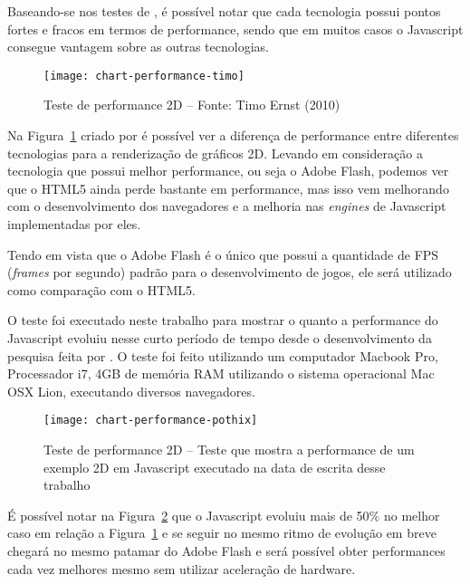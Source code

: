 Baseando-se nos testes de , é possível notar que
cada tecnologia possui pontos fortes e fracos em termos de performance, sendo que
em muitos casos o Javascript consegue vantagem sobre as outras tecnologias.

\begin{figure}[H]
  \centering
	\texttt{[image: chart-performance-timo]}
  \caption{Teste de performance 2D {--} Fonte: Timo Ernst (2010)}
  \label{img:chart-performance-timo}
\end{figure}

Na Figura~\ref{img:chart-performance-timo} criado por  é
possível ver a diferença de performance entre diferentes tecnologias para a
renderização de gráficos 2D.
Levando em consideração a tecnologia que possui melhor performance,
ou seja o Adobe Flash, podemos ver que o HTML5 ainda perde bastante em performance,
mas isso vem melhorando com o desenvolvimento dos navegadores e a melhoria nas
\textit{engines} de Javascript implementadas por eles.

Tendo em vista que o Adobe Flash é o único que possui a quantidade de FPS
(\textit{frames} por segundo) padrão para o desenvolvimento de jogos,
ele será utilizado como comparação com o HTML5.

O teste foi executado neste trabalho para mostrar o quanto a performance do Javascript evoluiu nesse curto
período de tempo desde o desenvolvimento da pesquisa feita por
. O teste foi feito utilizando um
computador Macbook Pro, Processador i7, 4GB de memória RAM utilizando o sistema
operacional Mac OSX Lion, executando diversos navegadores.

\begin{figure}[H]
  \centering
	\texttt{[image: chart-performance-pothix]}
  \caption{Teste de performance 2D {--} Teste que mostra a performance
  de um exemplo 2D em Javascript executado na data de escrita desse trabalho}
  \label{img:chart-performance-pothix}
\end{figure}

É possível notar na Figura~\ref{img:chart-performance-pothix} que o
Javascript evoluiu mais de 50\% no melhor caso
em relação a Figura~\ref{img:chart-performance-timo} e se seguir no mesmo ritmo de evolução
em breve chegará no mesmo patamar do Adobe Flash e será possível obter performances cada
vez melhores mesmo sem utilizar aceleração de hardware.

